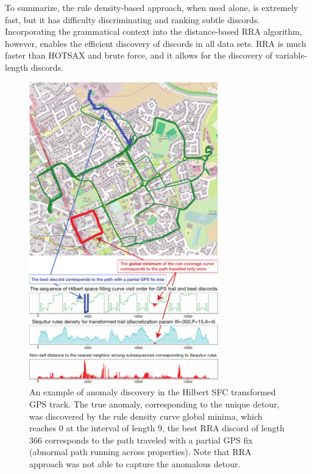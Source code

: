 \documentclass{sig-alternate}
\begin{document}
To summarize, the rule density-based approach, when used alone, is extremely fast, but it has difficulty discriminating and ranking subtle discords. Incorporating the grammatical context into the distance-based RRA algorithm, however, enables the efficient discovery of discords in all data sets. RRA is much faster than HOTSAX and brute force, and it allows for the discovery of variable-length discords. 


\begin{figure}[t]
   \centering
   \includegraphics[width=82mm]{path_figure-option-new.pdf}
   \caption{An example of anomaly discovery in the Hilbert SFC transformed GPS track. The true anomaly, corresponding to the unique detour, was discovered by the rule density curve global minima, which reaches 0 at the interval of length 9, the best RRA discord of length 366 corresponds to the path traveled with a partial GPS fix (abnormal path running across properties). Note that RRA approach was not able to capture the anomalous detour.}   
   \label{fig:gps}
\end{figure}
\end{document}
